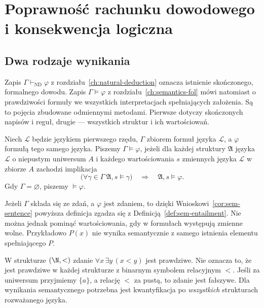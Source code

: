 \chapter[Poprawność rachunku pierwszego rzędu]{Poprawność rachunku dowodowego i konsekwencja logiczna}
\label{ch:soundness-fol}

\section{Dwa rodzaje wynikania}
Zapis $\Gamma\vdash_{\mathrm{ND}}\varphi$ z
rozdziału~\ref{ch:natural-deduction} oznacza istnienie
skończonego, formalnego dowodu. Zapis $\Gamma\models\varphi$
z rozdziału~\ref{ch:semantics-fol} mówi natomiast o
prawdziwości formuły we wszystkich interpretacjach spełniających założenia.
Są to pojęcia zbudowane odmiennymi metodami.
Pierwsze dotyczy skończonych napisów i reguł, drugie
— wszystkich struktur i ich wartościowań.

\begin{definicja}
\label{def:soundness-entailment-formulas}
Niech $\mathcal L$ będzie językiem pierwszego rzędu,
$\Gamma$ zbiorem formuł języka $\mathcal L$,
a $\varphi$ formułą tego samego języka.
Piszemy $\Gamma\models\varphi$, jeżeli dla każdej
struktury $\mathfrak A$ języka $\mathcal L$
o niepustym uniwersum $A$ i każdego wartościowania $s$ zmiennych języka
$\mathcal L$ w zbiorze $A$ zachodzi implikacja
\[
\bigl(\forall\gamma\in\Gamma\ \mathfrak A,s\models\gamma\bigr)
\quad\Longrightarrow\quad
\mathfrak A,s\models\varphi.
\]
Gdy $\Gamma=\varnothing$, piszemy $\models\varphi$.
\end{definicja}
Jeżeli $\Gamma$ składa się ze zdań, a $\varphi$ jest zdaniem,
to dzięki Wnioskowi~\ref{cor:sem-sentence}
powyższa definicja zgadza się z
Definicją~\ref{def:sem-entailment}.
Nie można jednak pominąć wartościowania, gdy w formułach występują
zmienne wolne. Przykładowo $P(x)$ nie wynika semantycznie
z samego istnienia elementu spełniającego $P$.

\begin{przyklad}
W strukturze $(\N,<)$ zdanie $\forall x\,\exists y\,(x<y)$
jest prawdziwe. Nie oznacza to, że jest prawdziwe
w każdej strukturze z binarnym symbolem relacyjnym $<$.
Jeśli za uniwersum przyjmiemy $\{a\}$, a relację $<$
za pustą, to zdanie jest fałszywe. Dla wynikania
semantycznego potrzebna jest kwantyfikacja po \emph{wszystkich}
strukturach rozważanego języka.
\end{przyklad}


